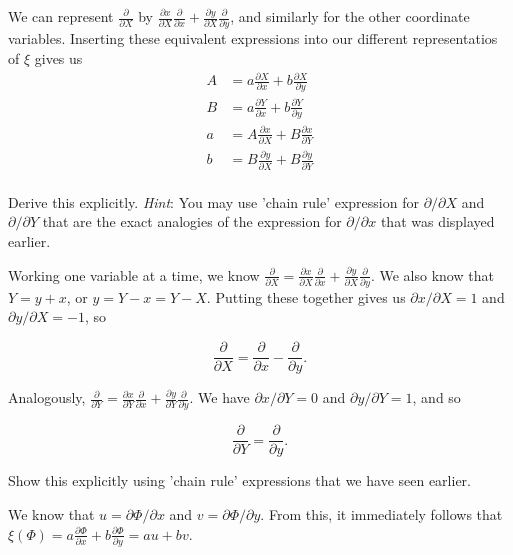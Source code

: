 \documentclass[../the-road-to-reality.tex]{subfiles}
\begin{document}
\begin{questions}
\begin{solution}
	We can represent $\frac{\partial}{\partial{X}}$ by $\frac{\partial{x}}{\partial{X}}\frac{\partial}{\partial{x}} + \frac{\partial{y}}{\partial{X}}\frac{\partial}{\partial{y}}$, and similarly for the other coordinate variables. Inserting these equivalent expressions into our different representatios of $\xi$ gives us
	\begin{align*}
		A &= a\frac{\partial{X}}{\partial{x}} + b\frac{\partial{X}}{\partial{y}} \\
		B &= a\frac{\partial{Y}}{\partial{x}} + b\frac{\partial{Y}}{\partial{y}} \\
		a &= A\frac{\partial{x}}{\partial{X}} + B\frac{\partial{x}}{\partial{Y}} \\
		b &= B\frac{\partial{y}}{\partial{X}} + B\frac{\partial{y}}{\partial{Y}} \\
	\end{align*}
\end{solution}

\question Derive this explicitly. \textit{Hint}: You may use 'chain rule' expression for $\partial/\partial{X}$ and $\partial/\partial{Y}$ that are the exact analogies of the expression for $\partial/\partial{x}$ that was displayed earlier.

\begin{solution}
	Working one variable at a time, we know $\frac{\partial}{\partial{X}} = \frac{\partial{x}}{\partial{X}}\frac{\partial}{\partial{x}} + \frac{\partial{y}}{\partial{X}}\frac{\partial}{\partial{y}}$. We also know that $Y = y + x$, or $y = Y - x = Y - X$. Putting these together gives us $\partial{x}/\partial{X} = 1$ and $\partial{y}/\partial{X} = -1$, so
	
	\[
	\frac{\partial}{\partial{X}} = \frac{\partial}{\partial{x}} - \frac{\partial}{\partial{y}}
	.\] 

	Analogously, $\frac{\partial}{\partial{Y}} = \frac{\partial{x}}{\partial{Y}}\frac{\partial}{\partial{x}} + \frac{\partial{y}}{\partial{Y}}\frac{\partial}{\partial{y}}$. We have $\partial{x}/\partial{Y} = 0$ and $\partial{y}/\partial{Y} = 1$, and so
	
	\[
	\frac{\partial}{\partial{Y}} = \frac{\partial}{\partial{y}}
	.\] 
\end{solution}

\question Show this explicitly using 'chain rule' expressions that we have seen earlier.

\begin{solution}
	We know that $u = \partial\Phi/\partial{x}$ and $v = \partial\Phi/\partial{y}$. From this, it immediately follows that $\xi(\Phi) = a\frac{\partial\Phi}{\partial{x}} + b\frac{\partial\Phi}{\partial{y}} = au + bv$.
\end{solution}


\end{questions}
\end{document}
